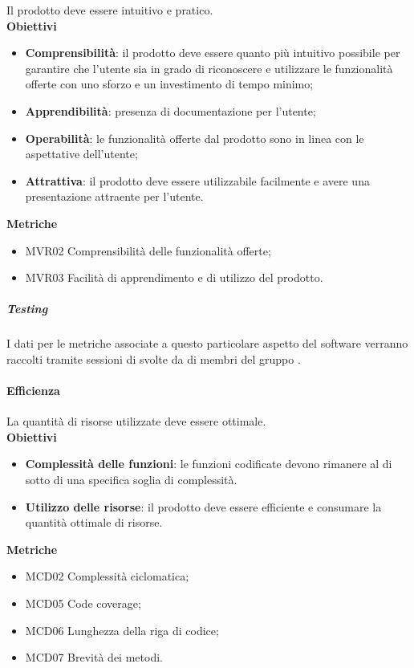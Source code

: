 Il prodotto deve essere intuitivo e pratico. \\

\textbf{Obiettivi}
\begin{itemize}
\item \textbf{Comprensibilità}: il prodotto deve essere quanto più intuitivo possibile per garantire che l'utente sia in grado di riconoscere e utilizzare le funzionalità offerte con uno sforzo e un investimento di tempo minimo;
\item \textbf{Apprendibilità}: presenza di documentazione per l'utente;
\item \textbf{Operabilità}: le funzionalità offerte dal prodotto sono in linea con le aspettative dell'utente;
\item \textbf{Attrattiva}: il prodotto deve essere utilizzabile facilmente e avere una presentazione attraente per l'utente.
\end{itemize}

\textbf{Metriche}
\begin{itemize}
\item MVR02 Comprensibilità delle funzionalità offerte;
\item MVR03 Facilità di apprendimento e di utilizzo del prodotto.
\end{itemize}

\subparagraph{Testing}
I dati per le metriche associate a questo particolare aspetto del software verranno raccolti tramite sessioni di  svolte da di membri del gruppo \gruppo{}. \\


\paragraph{Efficienza}

La quantità di risorse utilizzate deve essere ottimale. \\

\textbf{Obiettivi}
\begin{itemize}
\item \textbf{Complessità delle funzioni}: le funzioni codificate devono rimanere al di sotto di una specifica soglia di complessità.
\item \textbf{Utilizzo delle risorse}: il prodotto deve essere efficiente e consumare la quantità ottimale di risorse.
\end{itemize}

\textbf{Metriche}
\begin{itemize}
\item MCD02 Complessità ciclomatica;
\item MCD05 Code coverage;
\item MCD06 Lunghezza della riga di codice;
\item MCD07 Brevità dei metodi.
\end{itemize}

